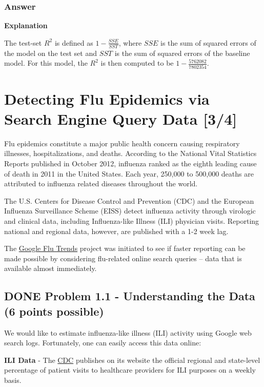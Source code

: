 \documentclass[letterpaper, 9pt, onecolumn, twoside, technote, final]{IEEEtran}
\begin{document}
\subsubsection{Answer}
\label{sec-2-16-1}

\textbf{Explanation}

The test-set $R^2$ is defined as $1-\frac{SSE}{SST}$, where $SSE$ is
the sum of squared errors of the model on the test set and $SST$ is
the sum of squared errors of the baseline model. For this model, the
$R^2$ is then computed to be $1-\frac{5762082}{7802354}$.

\section{Detecting Flu Epidemics via Search Engine Query Data [3/4]}
\label{sec-3}

Flu epidemics constitute a major public health concern causing
respiratory illnesses, hospitalizations, and deaths. According to the
National Vital Statistics Reports published in October 2012, influenza
ranked as the eighth leading cause of death in 2011 in the United
States. Each year, 250,000 to 500,000 deaths are attributed to
influenza related diseases throughout the world.

The U.S. Centers for Disease Control and Prevention (CDC) and the
European Influenza Surveillance Scheme (EISS) detect influenza
activity through virologic and clinical data, including Influenza-like
Illness (ILI) physician visits. Reporting national and regional data,
however, are published with a 1-2 week lag.

The \href{https://www.google.org/flutrends/us/#US}{Google Flu Trends} project was initiated to see if faster reporting
can be made possible by considering flu-related online search queries
-- data that is available almost immediately.

\subsection{{\bfseries\sffamily DONE} Problem 1.1 - Understanding the Data (6 points possible)}
\label{sec-3-1}
We would like to estimate influenza-like illness (ILI) activity using
Google web search logs. Fortunately, one can easily access this data
online:

\textbf{ILI Data} - The \href{http://www.cdc.gov/flu/weekly/fluactivitysurv.htm}{CDC} publishes on its website the official regional and
state-level percentage of patient visits to healthcare providers for
ILI purposes on a weekly basis.
\end{document}
